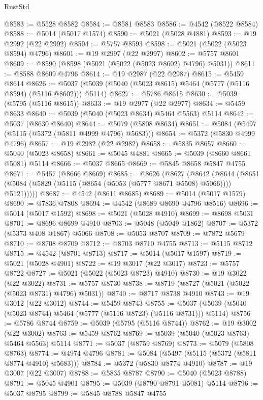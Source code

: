 \begin{lexlean}{RustStd}
\begin{coremodule}
@8583 := @5528 @8582
@8584 := @8581 @8583
@8586 := @4542 (@8522 @8584)
@8588 := @5014 (@5017 @1574)
@8590 := @5021 (@5028 @4881)
@8593 := @19 @2992 (@22 @2992)
@8594 := @5757 @8593
@8598 := @5021 (@5022 (@5023 @8594) @4796)
@8601 := @19 @2997 (@22 @2997)
@8602 := @5757 @8601
@8609 := @8590 (@8598 (@5021 (@5022 (@5023 @8602) @4796) @5031))
@8611 := @8588 @8609 @4796
@8614 := @19 @2987 (@22 @2987)
@8615 := @5459 @8614
@8626 := @5037 (@5039 (@5040 (@5023 @8615) @5464 (@5777 (@5116 @8594) (@5116 @8602))) @5114)
@8627 := @5786 @8615
@8630 := @5039 (@5795 (@5116 @8615))
@8633 := @19 @2977 (@22 @2977)
@8634 := @5459 @8633
@8640 := @5039 (@5040 (@5023 @8634) @5464 @5563) @5114
@8642 := @5037 (@8630 @8640)
@8644 := @5079 (@5808 @8634)
@8651 := @5084 (@5497 (@5115 (@5372 (@5811 @4999 @4796) @5683)))
@8654 := @5372 (@5830 @4999 @4796)
@8657 := @19 @2982 (@22 @2982)
@8658 := @5835 @8657
@8660 := @5040 (@5023 @8658)
@8661 := @5045 @4881
@8665 := @5039 (@8660 @8661 @5081) @5114
@8666 := @5037 @8665
@8669 := @5845 @8658 @5847 @4755
@8671 := @5457 (@8666 @8669)
@8685 := @8626
    (@8627
      (@8642
        (@8644 (@8651 (@5084 (@5829 (@5115 (@8654 (@5053 (@5777 @8671 @5508) @5066)))) @5121)))))
@8687 := @4542 (@8611 @8685)
@8689 := @5014 (@5017 @1579)
@8690 := @7836 @7808
@8694 := @4542 (@8689 @8690 @4796 @8516)
@8696 := @5014 (@5017 @1592)
@8698 := @5021 (@5028 @4910)
@8699 := @8698 @5031
@8701 := @8696 @8699 @4910
@8703 := @5048 (@5049 @1862)
@8707 := @5372 (@5373 @408 @1867) @5066
@8708 := @5053 @8707
@8709 := @7872 @5679
@8710 := @8708 @8709
@8712 := @8703 @8710 @4755
@8713 := @5115 @8712
@8715 := @4542 (@8701 @8713)
@8717 := @5014 (@5017 @1597)
@8719 := @5021 (@5028 @4901)
@8722 := @19 @3017 (@22 @3017)
@8723 := @5757 @8722
@8727 := @5021 (@5022 (@5023 @8723) @4910)
@8730 := @19 @3022 (@22 @3022)
@8731 := @5757 @8730
@8738 := @8719 (@8727 (@5021 (@5022 (@5023 @8731) @4796) @5031))
@8740 := @8717 @8738 @4910
@8743 := @19 @3012 (@22 @3012)
@8744 := @5459 @8743
@8755 := @5037 (@5039 (@5040 (@5023 @8744) @5464 (@5777 (@5116 @8723) (@5116 @8731))) @5114)
@8756 := @5786 @8744
@8759 := @5039 (@5795 (@5116 @8744))
@8762 := @19 @3002 (@22 @3002)
@8763 := @5459 @8762
@8769 := @5039 (@5040 (@5023 @8763) @5464 @5563) @5114
@8771 := @5037 (@8759 @8769)
@8773 := @5079 (@5808 @8763)
@8774 := @4974 @4796
@8781 := @5084 (@5497 (@5115 (@5372 (@5811 @8774 @4910) @5683)))
@8784 := @5372 (@5830 @8774 @4910)
@8787 := @19 @3007 (@22 @3007)
@8788 := @5835 @8787
@8790 := @5040 (@5023 @8788)
@8791 := @5045 @4901
@8795 := @5039 (@8790 @8791 @5081) @5114
@8796 := @5037 @8795
@8799 := @5845 @8788 @5847 @4755

\end{coremodule}
\end{lexlean}
